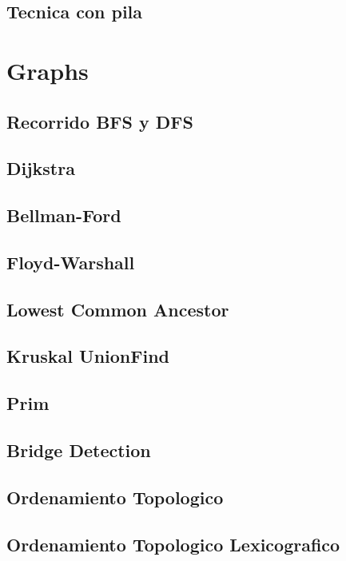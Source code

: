 \subsection{Tecnica con pila}
\raggedbottom
\hrulefill

\section{Graphs}
\subsection{Recorrido BFS y DFS}
\raggedbottom
\hrulefill
\subsection{Dijkstra}
\raggedbottom
\hrulefill
\subsection{Bellman-Ford}
\raggedbottom
\hrulefill
\subsection{Floyd-Warshall}
\raggedbottom
\hrulefill
\subsection{Lowest Common Ancestor}
\raggedbottom
\hrulefill
\subsection{Kruskal UnionFind}
\raggedbottom
\hrulefill
\subsection{Prim}
\raggedbottom
\hrulefill
\subsection{Bridge Detection}
\raggedbottom
\hrulefill
\subsection{Ordenamiento Topologico}
\raggedbottom
\hrulefill
\subsection{Ordenamiento Topologico Lexicografico}
\raggedbottom
\hrulefill

